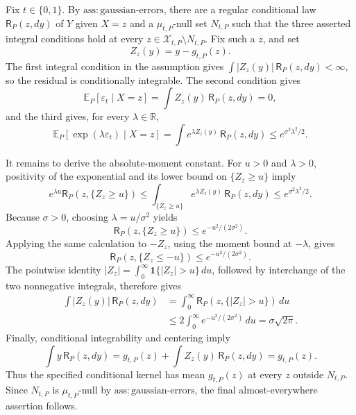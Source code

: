 Fix \(t\in\{0,1\}\). By \(\mathrm{ass:gaussian\text{-}errors}\), there are a regular conditional law \(\mathsf R_P(z,dy)\) of \(Y\) given \(X=z\) and a \(\mu_{t,P}\)-null set \(N_{t,P}\) such that the three asserted integral conditions hold at every \(z\in\mathcal X_{t,P}\setminus N_{t,P}\). Fix such a \(z\), and set
\[
 Z_z(y)=y-g_{t,P}(z).
\]
The first integral condition in the assumption gives \(\int |Z_z(y)|\,\mathsf R_P(z,dy)<\infty\), so the residual is conditionally integrable. The second condition gives
\[
 \mathbb E_P[\varepsilon_t\mid X=z]
 =\int Z_z(y)\,\mathsf R_P(z,dy)=0,
\]
and the third gives, for every \(\lambda\in\mathbb R\),
\[
 \mathbb E_P[\exp(\lambda\varepsilon_t)\mid X=z]
 =\int e^{\lambda Z_z(y)}\,\mathsf R_P(z,dy)
 \le e^{\sigma^2\lambda^2/2}.
\]

It remains to derive the absolute-moment constant. For \(u>0\) and \(\lambda>0\), positivity of the exponential and its lower bound on \(\{Z_z\ge u\}\) imply
\[
 e^{\lambda u}\mathsf R_P(z,\{Z_z\ge u\})
 \le \int_{\{Z_z\ge u\}}e^{\lambda Z_z(y)}\,\mathsf R_P(z,dy)
 \le e^{\sigma^2\lambda^2/2}.
\]
Because \(\sigma>0\), choosing \(\lambda=u/\sigma^2\) yields
\[
 \mathsf R_P(z,\{Z_z\ge u\})\le e^{-u^2/(2\sigma^2)}.
\]
Applying the same calculation to \(-Z_z\), using the moment bound at \(-\lambda\), gives
\[
 \mathsf R_P(z,\{Z_z\le-u\})\le e^{-u^2/(2\sigma^2)}.
\]
The pointwise identity \(|Z_z|=\int_0^\infty\mathbf 1\{|Z_z|>u\}\,du\), followed by interchange of the two nonnegative integrals, therefore gives
\[
\begin{aligned}
 \int |Z_z(y)|\,\mathsf R_P(z,dy)
 &=\int_0^\infty \mathsf R_P(z,\{|Z_z|>u\})\,du\\
 &\le 2\int_0^\infty e^{-u^2/(2\sigma^2)}\,du
 =\sigma\sqrt{2\pi}.
\end{aligned}
\]
Finally, conditional integrability and centering imply
\[
 \int y\,\mathsf R_P(z,dy)
 =g_{t,P}(z)+\int Z_z(y)\,\mathsf R_P(z,dy)
 =g_{t,P}(z).
\]
Thus the specified conditional kernel has mean \(g_{t,P}(z)\) at every \(z\) outside \(N_{t,P}\). Since \(N_{t,P}\) is \(\mu_{t,P}\)-null by \(\mathrm{ass:gaussian\text{-}errors}\), the final almost-everywhere assertion follows.